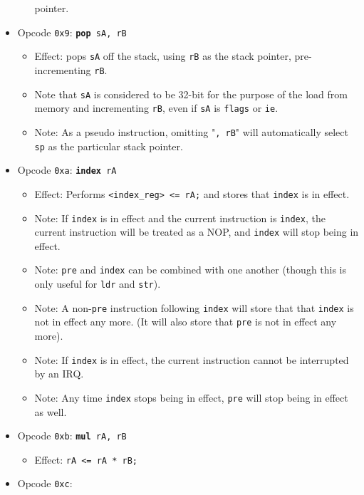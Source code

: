 \documentclass{article}
\begin{document}
\begin{itemize}
\begin{itemize}
			pointer. 
		\end{itemize}
	\item Opcode \texttt{0x9}:
		\texttt{\textbf{pop} sA, rB}
		\begin{itemize}
		\item Effect: pops \texttt{sA} off the stack, using
		\texttt{rB} as the stack pointer, pre-incrementing \texttt{rB}.
		\item Note that \texttt{sA} is considered to be 32-bit for the
		purpose of the load from memory and incrementing \texttt{rB},
		even if \texttt{sA} is \texttt{flags} or \texttt{ie}.
		\item Note: As a pseudo instruction, omitting "\texttt{, rB}" will
			automatically select \texttt{sp} as the particular stack
			pointer. 
		\end{itemize}
	\item Opcode \texttt{0xa}:
		\texttt{\textbf{index} rA}
		\begin{itemize}
		\item Effect: Performs \texttt{<index\_reg> <= rA;} and stores
		that \texttt{index} is in effect.
		\item Note: If \texttt{index} is in effect and the current
		instruction is \texttt{index}, the current instruction will be
		treated as a NOP, and \texttt{index} will stop being in effect.
		\item Note: \texttt{pre} and \texttt{index} can be combined
		with one another (though this is only useful for \texttt{ldr}
		and \texttt{str}).
		\item Note: A non-\texttt{pre} instruction following
		\texttt{index} will store that that \texttt{index} is not in
		effect any more. (It will also store that \texttt{pre} is not
		in effect any more).
		\item Note: If \texttt{index} is in effect, the current
		instruction cannot be interrupted by an IRQ.
		\item Note: Any time \texttt{index} stops being in effect,
		\texttt{pre} will stop being in effect as well.
		\end{itemize}
	\item Opcode \texttt{0xb}:
		\texttt{\textbf{mul} rA, rB}
		\begin{itemize}
		\item Effect: \texttt{rA <= rA * rB;}
		\end{itemize}
	\item Opcode \texttt{0xc}:

\end{itemize}
\end{document}
